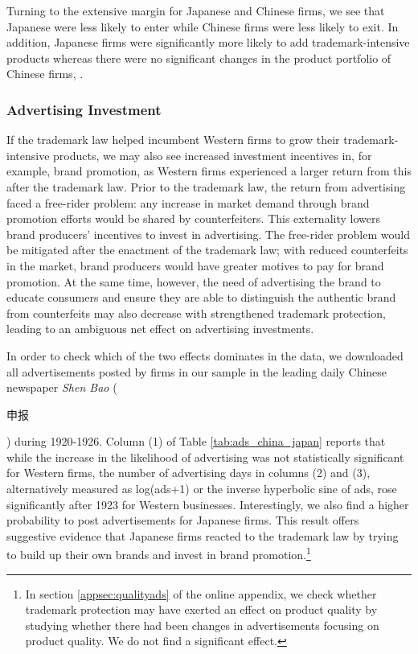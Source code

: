 \documentclass[12pt]{article}
\begin{document}
Turning to the extensive margin for Japanese and Chinese firms, we see that Japanese were less likely to enter while Chinese firms were less likely to exit. In addition, Japanese firms were significantly more likely to add trademark-intensive products whereas there were no significant changes in the product portfolio of Chinese firms, .


\subsubsection{Advertising Investment}

If the trademark law helped incumbent Western firms to grow their trademark-intensive products, we may also see increased investment incentives in, for example, brand promotion, as Western firms experienced a larger return from this after the trademark law. Prior to the trademark law, the return from advertising faced a free-rider problem: any increase in market demand through brand promotion efforts would be shared by counterfeiters. This externality lowers brand producers' incentives to invest in advertising. The free-rider problem would be mitigated after the enactment of the trademark law; with reduced counterfeits in the market, brand producers would have greater motives to pay for brand promotion. At the same time, however, the need of advertising the brand to educate consumers and ensure they are able to distinguish the authentic brand from counterfeits may also decrease with strengthened trademark protection, leading to an ambiguous net effect on advertising investments.

In order to check which of the two effects dominates in the data, we downloaded all advertisements posted by firms in our sample in the leading daily Chinese newspaper \emph{Shen Bao} (\begin{CJK*}{UTF8}{gbsn}申报\end{CJK*})  during 1920-1926. Column (1) of Table \ref{tab:ads_china_japan} reports that while the increase in the likelihood of advertising was not statistically significant for Western firms, the number of advertising days in columns (2) and (3), alternatively measured as log(ads+1) or the inverse hyperbolic sine of ads, rose significantly after 1923 for Western businesses. Interestingly, we also find a higher probability to post advertisements for Japanese firms. This result offers suggestive evidence that Japanese firms reacted to the trademark law by trying to build up their own brands and invest in brand promotion.\footnote{In  section \ref{appsec:qualityads} of the online appendix, we check whether trademark protection may have exerted an effect on product quality by studying whether there had been changes in advertisements focusing on product quality. We do not find a significant effect.} 
\end{document}
